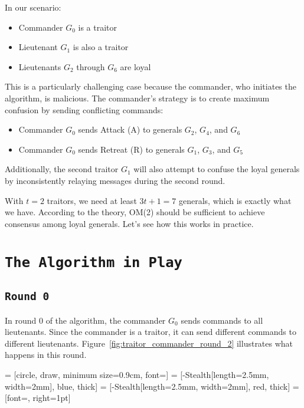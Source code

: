 \documentclass[11pt]{article}
\newcommand{\gen}[1]{\ensuremath{G_{#1}}}
\begin{document}
In our scenario:
\begin{itemize}
    \item Commander $G_0$ is a traitor
    \item Lieutenant $G_1$ is also a traitor
    \item Lieutenants $G_2$ through $G_6$ are loyal
\end{itemize}

This is a particularly challenging case because the commander, who initiates the algorithm, is malicious. The commander's strategy is to create maximum confusion by sending conflicting commands:
\begin{itemize}
    \item Commander $G_0$ sends Attack (A) to generals $G_2$, $G_4$, and $G_6$
    \item Commander $G_0$ sends Retreat (R) to generals $G_1$, $G_3$, and $G_5$
\end{itemize}

Additionally, the second traitor $G_1$ will also attempt to confuse the loyal generals by inconsistently relaying messages during the second round.

With $t = 2$ traitors, we need at least $3t+1 = 7$ generals, which is exactly what we have. According to the theory, OM(2) should be sufficient to achieve consensus among loyal generals. Let's see how this works in practice.

\section*{\texttt{\Large The Algorithm in Play}}

\subsection*{\texttt{\large Round 0}}
\justifying
In round 0 of the algorithm, the commander $\gen{0}$ sends commands to all lieutenants. Since the commander is a traitor, it can send different commands to different lieutenants. Figure~\ref{fig:traitor_commander_round_2} illustrates what happens in this round.


 = [circle, draw, minimum size=0.9cm, font=\small]
 = [-{Stealth[length=2.5mm, width=2mm]}, blue, thick] %
 = [-{Stealth[length=2.5mm, width=2mm]}, red, thick]  %
 = [font=\scriptsize, right=1pt]
\end{document}
